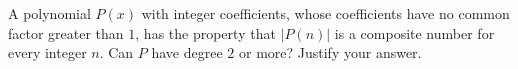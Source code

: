 A polynomial $P(x)$ with integer coefficients, whose coefficients have no common factor greater than $1$, has the property that $|P(n)|$ is a composite number for every integer $n$. Can $P$ have degree $2$ or more? Justify your answer.
